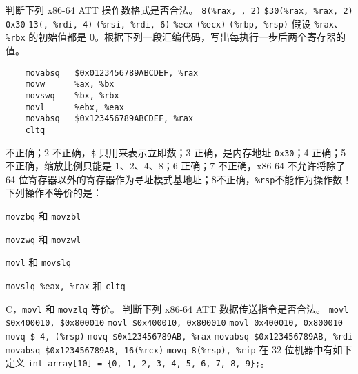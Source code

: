     \begin{problems}
        \pro 判断下列 x86-64 ATT 操作数格式是否合法。
            \qn \verb|8(%rax, , 2)|
            \qn \verb|$30(%rax, %rax, 2)|
            \qn \verb|0x30|
            \qn \verb|13(, %rdi, 4)|
            \qn \verb|(%rsi, %rdi, 6)|
            \qn \verb|%ecx|
            \qn \verb|(%ecx)|
            \qn \verb|(%rbp, %rsp)|
        \pro 假设 \verb|%rax|、\verb|%rbx| 的初始值都是 0。根据下列一段汇编代码，写出每执行一步后两个寄存器的值。
        \begin{verbatim}
    movabsq   $0x0123456789ABCDEF, %rax
    movw      %ax, %bx
    movswq    %bx, %rbx
    movl      %ebx, %eax
    movabsq   $0x123456789ABCDEF, %rax
    cltq
        \end{verbatim}
         不正确；2 不正确，\verb|$| 只用来表示立即数；3 正确，是内存地址 \verb|0x30|；4 正确；5 不正确，缩放比例只能是 1、2、4、8；6 正确；7 不正确，x86-64 不允许将除了 64 位寄存器以外的寄存器作为寻址模式基地址；8不正确，\verb|%rsp|不能作为操作数！
        \pro 下列操作不等价的是：
        \begin{choices}
            \item \verb|movzbq| 和 \verb|movzbl|
            \item \verb|movzwq| 和 \verb|movzwl|
            \item \verb|movl| 和 \verb|movslq|
            \item \verb|movslq %eax, %rax| 和 \verb|cltq|
        \end{choices}
        \sol C，\verb|movl| 和 \verb|movzlq| 等价。
        \pro 判断下列 x86-64 ATT 数据传送指令是否合法。
            \qn \verb|movl $0x400010, $0x800010|
            \qn \verb|movl $0x400010, 0x800010|
            \qn \verb|movl 0x400010, 0x800010|
            \qn \verb|movq $-4, (%rsp)|
            \qn \verb|movq $0x123456789AB, %rax|
            \qn \verb|movabsq $0x123456789AB, %rdi|
            \qn \verb|movabsq $0x123456789AB, 16(%rcx)|
            \qn \verb|movq 8(%rsp), %rip|
        \pro 在 32 位机器中有如下定义 \texttt{int array[10] = \{0, 1, 2, 3, 4, 5, 6, 7, 8, 9\};}。
        

\end{problems}
